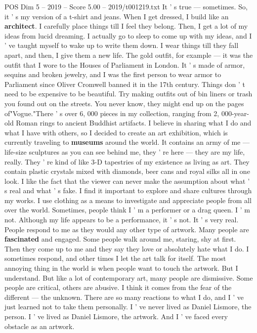 \begin{textsample}{POS Dim 5 – 2019 – Score 5.00 – 2019/t001219.txt}
It ' s true — sometimes.
So, it ' s my version of a t-shirt and jeans.
When I get dressed, I build like an \textbf{architect}.
I carefully place things till I feel they belong.
Then, I get a lot of my ideas from lucid dreaming.
I actually go to sleep to come up with my ideas, and I ' ve taught myself to wake up to write them down.
I wear things till they fall apart, and then, I give them a new life.
The gold outfit, for example — it was the outfit that I wore to the Houses of Parliament in London.
It ' s made of armor, sequins and broken jewelry, and I was the first person to wear armor to Parliament since Oliver Cromwell banned it in the 17th century.
Things don ' t need to be expensive to be beautiful.
Try making outfits out of bin liners or trash you found out on the streets.
You never know, they might end up on the pages of"Vogue."There ' s over 6, 000 pieces in my collection, ranging from 2, 000-year-old Roman rings to ancient Buddhist artifacts.
I believe in sharing what I do and what I have with others, so I decided to create an art exhibition, which is currently traveling to \textbf{museums} around the world.
It contains an army of me — life-size sculptures as you can see behind me, they ' re here — they are my life, really.
They ' re kind of like 3-D tapestries of my existence as living as art.
They contain plastic crystals mixed with diamonds, beer cans and royal silks all in one look.
I like the fact that the viewer can never make the assumption about what ' s real and what ' s fake.
I find it important to explore and share cultures through my works.
I use clothing as a means to investigate and appreciate people from all over the world.
Sometimes, people think I ' m a performer or a drag queen.
I ' m not.
Although my life appears to be a performance, it ' s not.
It ' s very real.
People respond to me as they would any other type of artwork.
Many people are \textbf{fascinated} and engaged.
Some people walk around me, staring, shy at first.
Then they come up to me and they say they love or absolutely hate what I do.
I sometimes respond, and other times I let the art talk for itself.
The most annoying thing in the world is when people want to touch the artwork.
But I understand.
But like a lot of contemporary art, many people are dismissive.
Some people are critical, others are abusive.
I think it comes from the fear of the different — the unknown.
There are so many reactions to what I do, and I ' ve just learned not to take them personally.
I ' ve never lived as Daniel Lismore, the person.
I ' ve lived as Daniel Lismore, the artwork.
And I ' ve faced every obstacle as an artwork.

\end{textsample}
